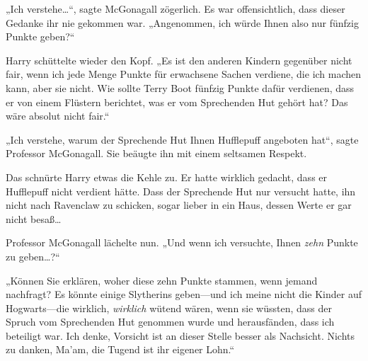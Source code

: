 „Ich verstehe…“, sagte McGonagall zögerlich. Es war offensichtlich, dass dieser Gedanke ihr nie gekommen war. „Angenommen, ich würde Ihnen also nur fünfzig Punkte geben?“

Harry schüttelte wieder den Kopf. „Es ist den anderen Kindern gegenüber nicht fair, wenn ich jede Menge Punkte für erwachsene Sachen verdiene, die ich machen kann, aber sie nicht. Wie sollte Terry Boot fünfzig Punkte dafür verdienen, dass er von einem Flüstern berichtet, was er vom Sprechenden Hut gehört hat? Das wäre absolut nicht fair.“

„Ich verstehe, warum der Sprechende Hut Ihnen Hufflepuff angeboten hat“, sagte Professor McGonagall. Sie beäugte ihn mit einem seltsamen Respekt.

Das schnürte Harry etwas die Kehle zu. Er hatte wirklich gedacht, dass er Hufflepuff nicht verdient hätte. Dass der Sprechende Hut nur versucht hatte, ihn nicht nach Ravenclaw zu schicken, sogar lieber in ein Haus, dessen Werte er gar nicht besaß…

Professor McGonagall lächelte nun. „Und wenn ich versuchte, Ihnen \emph{zehn} Punkte zu geben…?“

„Können Sie erklären, woher diese zehn Punkte stammen, wenn jemand nachfragt? Es könnte einige Slytherins geben—und ich meine nicht die Kinder auf Hogwarts—die wirklich, \emph{wirklich} wütend wären, wenn sie wüssten, dass der Spruch vom Sprechenden Hut genommen wurde und herausfänden, dass ich beteiligt war. Ich denke, Vorsicht ist an dieser Stelle besser als Nachsicht. Nichts zu danken, Ma'am, die Tugend ist ihr eigener Lohn.“

